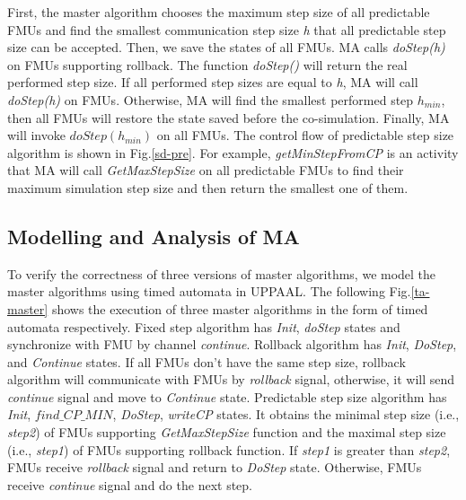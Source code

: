 First, the master algorithm chooses the maximum step size of all predictable FMUs and find the smallest communication step size \emph{h} that all predictable step size can be accepted. Then, we save the states of all FMUs. MA calls \emph{doStep(h)} on FMUs supporting rollback. The function \emph{doStep()} will return the real performed step size. If all performed step sizes are equal to \emph{h}, MA will call \emph{doStep(h)} on FMUs. Otherwise, MA will find the smallest performed step $h_{min}$, then all FMUs will restore the state saved before the co-simulation. Finally, MA will invoke $doStep(h_{min})$ on all FMUs. The control flow of predictable step size algorithm is shown in Fig.\ref{sd-pre}. For example, \emph{getMinStepFromCP} is an activity that MA will call \emph{GetMaxStepSize} on all predictable FMUs to find their maximum simulation step size and then return the smallest one of them. 

\subsection{Modelling and Analysis of MA} 
To verify the correctness of three versions of master algorithms, we model the master algorithms using timed automata in UPPAAL. The following Fig.\ref{ta-master} shows the execution of three master algorithms in the form of timed automata respectively. Fixed step algorithm has \emph{Init}, \emph{doStep} states and synchronize with FMU by channel \emph{continue}. Rollback algorithm has \emph{Init}, \emph{DoStep}, and \emph{Continue} states. If all FMUs don't have the same step size, rollback algorithm will communicate with FMUs by \emph{rollback} signal, otherwise, it will send \emph{continue} signal and move to \emph{Continue} state. Predictable step size algorithm has \emph{Init}, $find \_ CP \_ MIN$, \emph{DoStep}, \emph{writeCP} states. It obtains the minimal step size (i.e., \emph{step2}) of FMUs supporting \emph{GetMaxStepSize} function and the maximal step size (i.e., \emph{step1}) of FMUs supporting rollback function. If \emph{step1} is greater than \emph{step2}, FMUs receive \emph{rollback} signal and return to \emph{DoStep} state. Otherwise, FMUs receive \emph{continue} signal and do the next step.  




